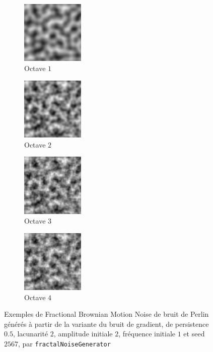 \documentclass[11pt]{article}
\begin{document}
\begin{figure}[H]
    \centering
    \begin{subfigure}{0.2\textwidth}
    \centering
            \includegraphics[width=3cm]{FBM-GRADIENT-O1-P05-L2-IA2-IF1-S2567.png}
        \caption{Octave $1$}
        \label{fig:fbmGradientO1}
    \end{subfigure}
    \begin{subfigure}{0.2\textwidth}
    \centering
        \includegraphics[width=3cm]{FBM-GRADIENT-O2-P05-L2-IA2-IF1-S2567.png}
        \caption{Octave $2$}
        \label{fig:fbmGradientO2}
    \end{subfigure}
    \begin{subfigure}{0.2\textwidth}
    \centering
        \includegraphics[width=3cm]{FBM-GRADIENT-O3-P05-L2-IA2-IF1-S2567.png}
        \caption{Octave $3$}
        \label{fig:fbmGradientO3}
    \end{subfigure}
    \begin{subfigure}{0.2\textwidth}
    \centering
        \includegraphics[width=3cm]{FBM-GRADIENT-O4-P05-L2-IA2-IF1-S2567.png}
        \caption{Octave $4$}
        \label{fig:fbmGradientO4}
    \end{subfigure}
    \caption{Exemples de Fractional Brownian Motion Noise de bruit de Perlin générés à partir de la variante du bruit de gradient, de persistence $0.5$, lacunarité $2$, amplitude initiale $2$, fréquence initiale $1$ et seed $2567$, par \texttt{fractalNoiseGenerator}}
    \label{fig:fbmGradient}
\end{figure}
\end{document}
